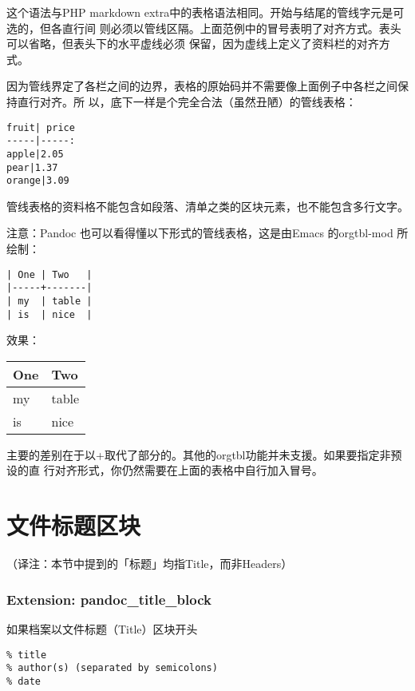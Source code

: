 \documentclass[fancyhdr,bookmark]{ctexbook}
\begin{document}
这个语法与PHP markdown
extra中的表格语法相同。开始与结尾的管线字元是可选的，但各直行间
则必须以管线区隔。上面范例中的冒号表明了对齐方式。表头可以省略，但表头下的水平虚线必须
保留，因为虚线上定义了资料栏的对齐方式。

因为管线界定了各栏之间的边界，表格的原始码并不需要像上面例子中各栏之间保持直行对齐。所
以，底下一样是个完全合法（虽然丑陋）的管线表格：

\begin{lstlisting}
fruit| price
-----|-----:
apple|2.05
pear|1.37
orange|3.09
\end{lstlisting}

管线表格的资料格不能包含如段落、清单之类的区块元素，也不能包含多行文字。

注意：Pandoc 也可以看得懂以下形式的管线表格，这是由Emacs 的orgtbl-mod
所绘制：

\begin{lstlisting}
| One | Two   |
|-----+-------|
| my  | table |
| is  | nice  |
\end{lstlisting}

效果：

\begin{longtable}[]{@{}ll@{}}
\toprule
One & Two\tabularnewline
\midrule
\endhead
my & table\tabularnewline
is & nice\tabularnewline
\bottomrule
\end{longtable}

主要的差别在于以+取代了部分的\textbar。其他的orgtbl功能并未支援。如果要指定非预设的直
行对齐形式，你仍然需要在上面的表格中自行加入冒号。

\hypertarget{ux6587ux4ef6ux6807ux9898ux533aux5757}{%
\section{文件标题区块}\label{ux6587ux4ef6ux6807ux9898ux533aux5757}}

（译注：本节中提到的「标题」均指Title，而非Headers）

\hypertarget{extension-pandoc_title_block}{%
\subsubsection{Extension:
pandoc\_title\_block}\label{extension-pandoc_title_block}}

如果档案以文件标题（Title）区块开头

\begin{lstlisting}
% title
% author(s) (separated by semicolons)
% date
\end{lstlisting}
\end{document}
